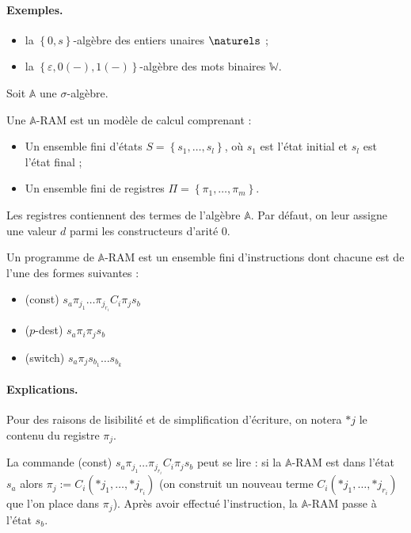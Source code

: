 \documentclass{article}
\newcommand{\bbA}{\mathbb{A}}
\begin{document}
		
		\paragraph{Exemples.}
		\begin{itemize}[itemsep=-1mm]
			\item 	la $\left\lbrace 0, s \right\rbrace$-algèbre des entiers unaires $\naturels$ ;
			\item 	la $\left\lbrace \varepsilon, 0(-), 1(-)\right\rbrace$-algèbre des mots binaires $\mathbb{W}$.
		\end{itemize}
		
		\espace
		
		Soit $\bbA$ une $\sigma$-algèbre. 
		
		\begin{definition}
			Une $\bbA$-RAM est un modèle de calcul comprenant :
			
			\begin{itemize}[itemsep=-1mm]
				\item 	Un ensemble fini d'états $S = \left\lbrace s_1, \dots, s_l \right\rbrace$, où $s_1$ est l'état initial et $s_l$ est l'état final ;
				\item 	Un ensemble fini de registres $\Pi = \left\lbrace \pi_1, \dots, \pi_m \right\rbrace$.
			\end{itemize}
			
			Les registres contiennent des termes de l'algèbre $\bbA$. Par défaut, on leur assigne une valeur $d$ parmi les constructeurs d'arité $0$. 
			
			Un programme de $\bbA$-RAM est un ensemble fini d'instructions dont chacune est de l'une des formes suivantes :
			
			\begin{itemize}[itemsep=-1mm]
				\item 	(const)			$s_a \pi_{j_1} \dots \pi_{j_{r_i}} C_i \pi_j s_b$
				\item	($p$-dest)		$s_a \pi_i \pi_j s_b$
				\item	(switch)		$s_a \pi_j s_{b_1} \dots s_{b_k}$
			\end{itemize}
			
			
			\paragraph{Explications.}
			Pour des raisons de lisibilité et de simplification d'écriture, on notera $*j$ le contenu du registre $\pi_j$. 
			
			La commande (const) $s_a \pi_{j_1} \dots \pi_{j_{r_i}} C_i \pi_j s_b$ peut se lire : si la $\bbA$-RAM est dans l'état $s_a$ alors $\pi_j := C_i\left( *j_1, \dots, *j_{r_i}\right)$ (on construit un nouveau terme $C_i\left( *j_1, \dots, *j_{r_i} \right)$ que l'on place dans $\pi_j$). Après avoir effectué l'instruction, la $\bbA$-RAM passe à l'état $s_b$.


\end{definition}
\end{document}
